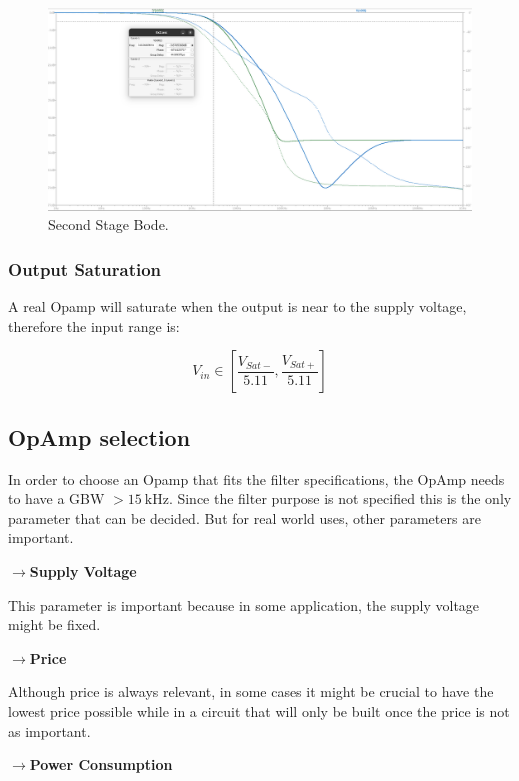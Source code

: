 \begin{figure}[H]
    \centering
    \includegraphics*[scale = 0.25]{Images/P2BodeGBWStg2.png}
    \caption{Second Stage Bode.}
\end{figure}

\subsubsection{Output Saturation}

A real Opamp will saturate when the output is near to the supply voltage, therefore the input range is:

\begin{equation}
   V_{in} \in \left [ \frac{V_{Sat-}}{5.11} , \frac{V_{Sat+}}{5.11} \right ]
\end{equation}

\subsection{OpAmp selection}

In order to choose an Opamp that fits the filter specifications, the OpAmp needs to have a GBW $> \SI{15}{\kilo\hertz}$. Since the filter purpose is not specified this is the only parameter that can be decided. But for real world uses, other parameters are important.

$\rightarrow$\textbf{Supply Voltage}

This parameter is important because in some application, the supply voltage might be fixed.

$\rightarrow$\textbf{Price}

Although price is always relevant, in some cases it might be crucial to have the lowest price possible while in a circuit that will only be built once the price is not as important. 

$\rightarrow$\textbf{Power Consumption}

